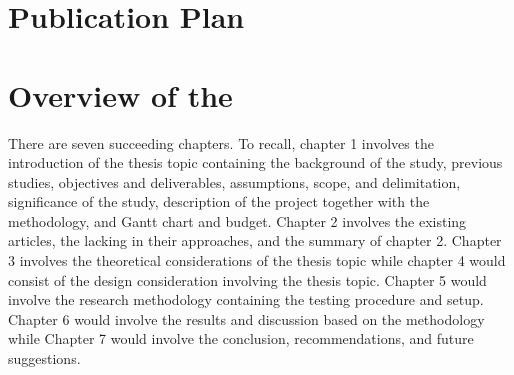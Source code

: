 \ifPhD
\section{Publication Plan}
\graytx{\blindtext}
\fi

\fi


\section{Overview of the \documentType}

There are seven succeeding chapters. To recall, chapter 1 involves the introduction of the
thesis topic containing the background of the study, previous studies, objectives and
deliverables, assumptions, scope, and delimitation, significance of the study, description
of the project together with the methodology, and Gantt chart and budget. Chapter 2
involves the existing articles, the lacking in their approaches, and the summary of
chapter 2. Chapter 3 involves the theoretical considerations of the thesis topic while
chapter 4 would consist of the design consideration involving the thesis topic. Chapter 5
would involve the research methodology containing the testing procedure and setup.
Chapter 6 would involve the results and discussion based on the methodology while
Chapter 7 would involve the conclusion, recommendations, and future suggestions.